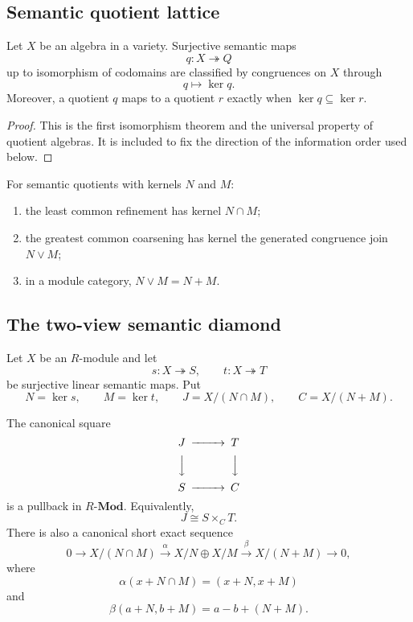 \subsection{Semantic quotient lattice}
\label{subsec:block17-quotient-lattice}

\begin{theorem}
\label{thm:block17-semantic-quotient-classification}
Let \(X\) be an algebra in a variety.  Surjective semantic maps
\[
 q:X\twoheadrightarrow Q
\]
up to isomorphism of codomains are classified by congruences on \(X\) through
\[
 q\longmapsto\ker q.
\]
Moreover, a quotient \(q\) maps to a quotient \(r\) exactly when \(\ker q\subseteq\ker r\).
\end{theorem}

\begin{proof}
This is the first isomorphism theorem and the universal property of quotient algebras.  It is included to fix the direction of the information order used below.
\end{proof}

\begin{corollary}
\label{cor:block17-combined-shared-semantics}
For semantic quotients with kernels \(N\) and \(M\):
\begin{enumerate}[label=\textup{(\roman*)}]
\item the least common refinement has kernel \(N\cap M\);
\item the greatest common coarsening has kernel the generated congruence join \(N\vee M\);
\item in a module category, \(N\vee M=N+M\).
\end{enumerate}
\end{corollary}

\subsection{The two-view semantic diamond}
\label{subsec:block17-semantic-diamond}

Let \(X\) be an \(R\)-module and let
\[
 s:X\twoheadrightarrow S,
 \qquad
 t:X\twoheadrightarrow T
\]
be surjective linear semantic maps.  Put
\[
 N=\ker s,
 \qquad
 M=\ker t,
 \qquad
 J=X/(N\cap M),
 \qquad
 C=X/(N+M).
\]

\begin{theorem}
\label{thm:block17-semantic-diamond}
The canonical square
\[
\begin{CD}
 J @>>> T\\
 @VVV @VVV\\
 S @>>> C
\end{CD}
\]
is a pullback in \(R\text{-}\mathbf{Mod}\).  Equivalently,
\[
 J\cong S\times_C T.
\]
There is also a canonical short exact sequence
\[
 0\longrightarrow X/(N\cap M)
 \xrightarrow{\alpha}
 X/N\oplus X/M
 \xrightarrow{\beta}
 X/(N+M)
 \longrightarrow0,
\]
where
\[
 \alpha(x+N\cap M)=(x+N,x+M)
\]
and
\[
 \beta(a+N,b+M)=a-b+(N+M).
\]
\end{theorem}

